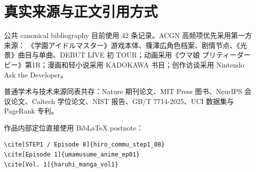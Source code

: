 \documentclass[profile=editorial,titlelayout=\AtelierSpecimenTitleLayout]{atelier}
\begin{document}
\clearpage
\section{真实来源与正文引用方式}

公共 canonical bibliography 目前使用 42 条记录。ACGN 高频项优先采用第一方来源：
《学園アイドルマスター》游戏本体\cite{gakumas_game}、篠澤広角色档案\cite{hiro_character_file}、剧情节点\cite[STEP1 / Episode 8]{hiro_commu_step1_08}、《光景》曲目与单曲\cite{hiro_song_koukei,hiro_1st_single}、DEBUT LIVE 初 TOUR\cite{gakumas_debut_live_hatsukoi}；动画采用《ウマ娘 プリティーダービー》第1R\cite[Episode 1]{umamusume_anime_ep01}；漫画和轻小说采用 KADOKAWA 书目\cite{haruhi_manga_vol1,haruhi_novel_vol1}；创作访谈采用 Nintendo Ask the Developer\cite{mario_wonder_developer_interview}。

普通学术与技术来源同表共存：Nature 期刊论文\cite{mnih2015dqn}、MIT Press 图书\cite{sutton_barto_2018}、NeurIPS 会议论文\cite{vaswani2017attention}、Caltech 学位论文\cite{vanhorn2019visipedia}、NIST 报告\cite{nist_ai_rmf_2023}、GB/T 7714-2025\cite{gbt7714_2025}、UCI 数据集\cite{uci_iris}与 PageRank 专利\cite{page2001pagerank}。

作品内部定位直接使用 BibLaTeX postnote：
\begin{verbatim}
\cite[STEP1 / Episode 8]{hiro_commu_step1_08}
\cite[Episode 1]{umamusume_anime_ep01}
\cite[Vol. 1]{haruhi_manga_vol1}
\end{verbatim}
\end{document}
